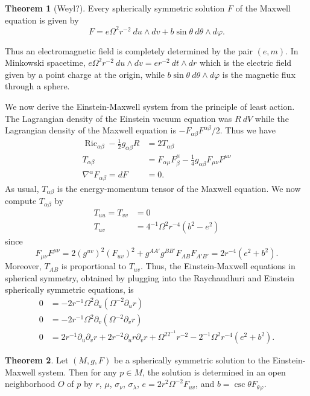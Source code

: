 \documentclass[12pt]{report}
\newcommand{\Ric}{\operatorname{Ric}}
\theoremstyle{definition}
\newtheorem{theorem}{Theorem}[chapter]
\begin{document}
\begin{theorem}[Weyl?]
    Every spherically symmetric solution $F$ of the Maxwell equation is given by
    $$F = e\Omega^2r^{-2}~du\wedge dv + b\sin \theta ~d\theta \wedge d\varphi.$$
\end{theorem}
Thus an electromagnetic field is completely determined by the pair $(e, m)$. In Minkowski spacetime, $e\Omega^2r^{-2} ~du\wedge dv = er^{-2} ~dt \wedge dr$ which is the electric field given by a point charge at the origin, while $b\sin \theta ~d\theta \wedge d\varphi$ is the magnetic flux through a sphere.

We now derive the Einstein-Maxwell system from the principle of least action. The Lagrangian density of the Einstein vacuum equation was $R~dV$ while the Lagrangian density of the Maxwell equation is $-F_{\alpha\beta}F^{\alpha\beta}/2$. Thus we have
\begin{align*}
    \Ric_{\alpha\beta} - \frac{1}{2}g_{\alpha\beta}R &= 2T_{\alpha\beta}\\
    T_{\alpha\beta} &= F_{\alpha\mu}F^\mu_\beta - \frac{1}{4}g_{\alpha\beta} F_{\mu\nu} F^{\mu\nu}\\
    \nabla^\alpha F_{\alpha\beta} = dF &= 0.
\end{align*}
As usual, $T_{\alpha\beta}$ is the energy-momentum tensor of the Maxwell equation. We now compute $T_{\alpha\beta}$ by
\begin{align*}
    T_{uu} = T_{vv} &= 0\\
    T_{uv} &= 4^{-1} \Omega^2 r^{-4}(b^2 - e^2)
\end{align*}
since
$$F_{\mu\nu} F^{\mu\nu} = 2(g^{uv})^2 (F_{uv})^2 + g^{AA'}g^{BB'} F_{AB} F_{A'B'} = 2r^{-4}(e^2 + b^2).$$
Moreover, $T_{AB}$ is proportional to $T_{uv}$. Thus, the Einstein-Maxwell equations in spherical symmetry, obtained by plugging into the Raychaudhuri and Einstein spherically symmetric equations, is
\begin{align*}
    0 &= -2r^{-1}\Omega^2 \partial_u (\Omega^{-2} \partial_ur)\\
    0 &= -2r^{-1}\Omega^2 \partial_v (\Omega^{-2} \partial_vr)\\
    0 &= 2r^{-1}\partial_u\partial_v r + 2r^{-2}\partial_ur\partial_vr + \Omega^22^{-1}r^{-2} - 2^{-1}\Omega^2r^{-4}(e^2 + b^2).
\end{align*}
\begin{theorem}
    Let $(M, g, F)$ be a spherically symmetric solution to the Einstein-Maxwell system. Then for any $p \in M$, the solution is determined in an open neighborhood $O$ of $p$ by $r$, $\mu$, $\sigma_\nu$, $\sigma_\lambda$, $e = 2r^2\Omega^{-2}F_{uv}$, and $b = \csc \theta F_{\theta \varphi}$.
\end{theorem}
\end{document}

